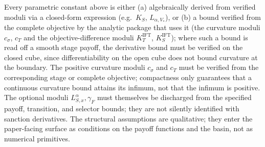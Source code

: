 Every parametric constant above is either (a) algebraically derived
from verified moduli via a closed-form expression
(e.g.\ $K_S$, $L_{\alpha,V_*}$), or (b) a bound verified from
the complete objective by the analytic package that uses it (the
curvature moduli $c_\sigma$, $c_T$ and the objective-difference moduli
$K_T^{\mathrm{IFT}}$, $K_S^{\mathrm{IFT}}$); where such a bound is read
off a smooth stage payoff, the derivative bound must be verified on the
closed cube, since differentiability on the open cube does not bound
curvature at the boundary.
The positive curvature moduli $c_\sigma$ and $c_T$ must be verified
from the corresponding stage or complete objective; compactness only
guarantees that a continuous curvature bound attains its infimum, not
that the infimum is positive. The optional moduli
$L_{S,x}^{\alpha},\gamma_F$ must
themselves be discharged from the specified payoff, transition, and
selector bounds; they are not silently identified with sanction
derivatives. The structural
assumptions  are
qualitative; they enter the paper-facing surface as conditions on
the payoff functions and the basin, not as numerical primitives.

